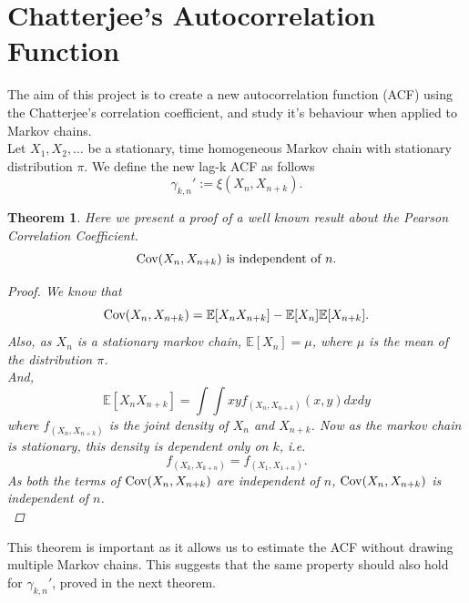 \documentclass{article}
\newtheorem{theorem}{Theorem}[section]
\begin{document}
\section{Chatterjee's Autocorrelation Function}
	The aim of this project is to create a new autocorrelation function (ACF) using the Chatterjee's correlation coefficient, and study it's behaviour when applied to Markov chains.\\
	Let $X_1, X_2, \dots$ be a stationary, time homogeneous Markov chain with stationary distribution $\pi$.
	We define the new lag-k ACF as follows
	$$\gamma_{k, n}' := \xi(X_n, X_{n+k}).$$

	\begin{theorem}
		Here we present a proof of a well known result about the Pearson Correlation Coefficient.
		$$\text{Cov}(X_n, X_{n+k}) \text{ is independent of } n.$$
		\begin{proof}
			We know that
			$$\text{Cov}(X_n, X_{n+k}) = \mathbb{E}[X_n X_{n+k}] - \mathbb{E}[X_n]\mathbb{E}[X_{n+k}].$$
			Also, as $X_n$ is a stationary markov chain, $\mathbb{E}[X_n] = \mu$, where $\mu$ is the mean of the distribution $\pi$.\\
			And,
			$$\mathbb{E}[X_n X_{n+k}] = \int\int xyf_{(X_n, X_{n+k})}(x, y)dxdy$$
			where $f_{(X_n, X_{n+k})}$ is the joint density of $X_n$ and $X_{n+k}$. Now as the markov chain is stationary, this density is dependent only on $k$, i.e. $$f_{(X_k, X_{k+n})} = f_{(X_1, X_{1+n})}.$$
			As both the terms of $\text{Cov}(X_n, X_{n+k})$ are independent of $n$, $\text{Cov}(X_n, X_{n+k})$ is independent of $n$.\\
		\end{proof}
	\end{theorem}
	This theorem is important as it allows us to estimate the ACF without drawing multiple Markov chains.
	This suggests that the same property should also hold for $\gamma_{k, n}'$, proved in the next theorem.
\end{document}
